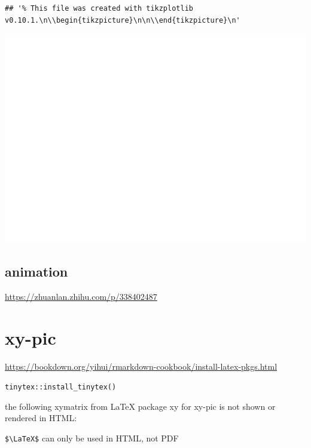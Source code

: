 \documentclass[
]{book}
\theoremstyle{definition}
\theoremstyle{definition}
\theoremstyle{definition}
\theoremstyle{definition}
\theoremstyle{remark}
\begin{document}
\begin{verbatim}
## '% This file was created with tikzplotlib v0.10.1.\n\\begin{tikzpicture}\n\n\\end{tikzpicture}\n'
\end{verbatim}

\includegraphics{202401311000-TikZ_files/figure-latex/unnamed-chunk-170-6}

\hypertarget{animation}{%
\section{animation}\label{animation}}

\url{https://zhuanlan.zhihu.com/p/338402487}

\hypertarget{xy-pic}{%
\chapter{xy-pic}\label{xy-pic}}

\url{https://bookdown.org/yihui/rmarkdown-cookbook/install-latex-pkgs.html}

\texttt{tinytex::install\_tinytex()}

the following xymatrix from LaTeX package xy for xy-pic is not shown or rendered in HTML:

\texttt{\$\textbackslash{}LaTeX\$} can only be used in HTML, not PDF

\end{document}
